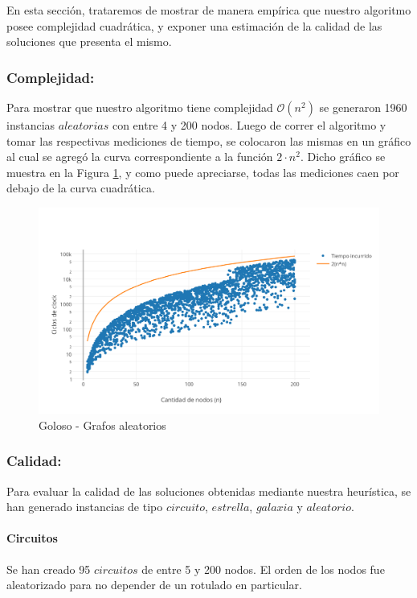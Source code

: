 En esta sección, trataremos de mostrar de manera empírica que nuestro algoritmo posee complejidad cuadrática, y exponer una estimación de la calidad de las soluciones que presenta el mismo.

\subsubsection{Complejidad:}

Para mostrar que nuestro algoritmo tiene complejidad $\mathcal{O}(n^2)$ se generaron 1960 instancias $aleatorias$ con entre 4 y 200 nodos. Luego de correr el algoritmo y tomar las respectivas mediciones de tiempo, se colocaron las mismas en un gráfico al cual se agregó la curva correspondiente a la función $2 \cdot n^2$.  Dicho gráfico se muestra en la Figura \ref{fig:2A}, y como puede apreciarse, todas las mediciones caen por debajo de la curva cuadrática. 

\begin{figure}[htb]
	\begin{center}
    		\includegraphics[scale=0.8]{imagenes/goloso-aleatorios.png}
	\end{center}
	\caption{Goloso - Grafos aleatorios\label{fig:2A}}
\end{figure}

\subsubsection{Calidad:}

Para evaluar la calidad de las soluciones obtenidas mediante nuestra heurística, se han generado instancias de tipo $circuito$, $estrella$, $galaxia$ y $aleatorio$.

\paragraph{Circuitos} Se han creado 95 $circuitos$ de entre 5 y 200 nodos.  El orden de los nodos fue aleatorizado para no depender de un rotulado en particular.

